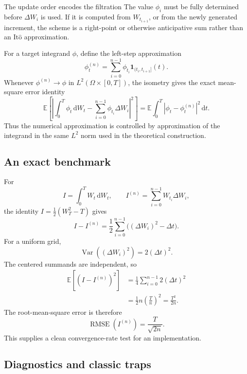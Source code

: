 \documentclass[10pt]{article}
\newcommand{\E}{\mathbb E}
\newcommand{\1}{\mathbf 1}
\newcommand{\dd}{\,\mathrm d}
\newcommand{\Ito}{\mathrm{It\hat{o}}}
\DeclareMathOperator{\Var}{Var}
\theoremstyle{definition}
\begin{document}
\begin{warningbox}{The update order encodes the filtration}
The value \(\phi_i\) must be fully determined before \(\Delta W_i\) is used.
If it is computed from \(W_{t_{i+1}}\), or from the newly generated increment,
the scheme is a right-point or otherwise anticipative sum rather than an
\(\Ito\) approximation.
\end{warningbox}

For a target integrand \(\phi\), define the left-step approximation
\[
\phi_t^{(n)}=\sum_{i=0}^{n-1}\phi_{t_i}\1_{(t_i,t_{i+1}]}(t).
\]
Whenever \(\phi^{(n)}\to\phi\) in
\(L^2(\Omega\times[0,T])\), the isometry gives the exact mean-square error
identity
\[
\boxed{
\E\left[
\left|
\int_0^T\phi_t\dd W_t-
\sum_{i=0}^{n-1}\phi_{t_i}\Delta W_i
\right|^2
\right]
=\E\int_0^T|\phi_t-\phi_t^{(n)}|^2\dd t.}
\]
Thus the numerical approximation is controlled by approximation of the
integrand in the same \(L^2\) norm used in the theoretical construction.

\subsection{An exact benchmark}

For
\[
I=\int_0^TW_t\dd W_t,
\qquad
I^{(n)}=\sum_{i=0}^{n-1}W_{t_i}\Delta W_i,
\]
the identity \(I=\frac12(W_T^2-T)\) gives
\[
I-I^{(n)}
=\frac12\sum_{i=0}^{n-1}\bigl((\Delta W_i)^2-\Delta t\bigr).
\]
For a uniform grid,
\[
\Var((\Delta W_i)^2)=2(\Delta t)^2.
\]
The centered summands are independent, so
\begin{align*}
\E[(I-I^{(n)})^2]
&=\frac14\sum_{i=0}^{n-1}2(\Delta t)^2\\
&=\frac12n\left(\frac{T}{n}\right)^2
=\boxed{\frac{T^2}{2n}}.
\end{align*}
The root-mean-square error is therefore
\[
\boxed{\operatorname{RMSE}(I^{(n)})=\frac{T}{\sqrt{2n}}.}
\]
This supplies a clean convergence-rate test for an implementation.

\subsection{Diagnostics and classic traps}
\end{document}
